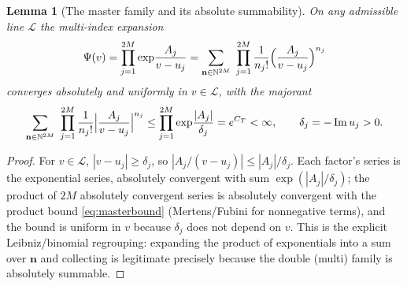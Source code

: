 \documentclass[11pt]{article}
\DeclareMathOperator{\Imag}{Im}
\newcommand{\N}{\mathbb{N}}
\theoremstyle{plain}
\newtheorem{lemma}[theorem]{Lemma}
\theoremstyle{definition}
\theoremstyle{remark}
\begin{document}
\begin{lemma}[The master family and its absolute summability]\label{lem:master}
On any admissible line $\mathcal L$ the multi-index expansion
\begin{equation}\label{eq:master}
   \Psi(v)=\prod_{j=1}^{2M}\exp\!\frac{A_j}{v-u_j}
   =\sum_{\mathbf n\in\N^{2M}}\ \prod_{j=1}^{2M}
      \frac{1}{n_j!}\Bigl(\frac{A_j}{v-u_j}\Bigr)^{n_j}
\end{equation}
converges absolutely and uniformly in $v\in\mathcal L$, with the majorant
\begin{equation}\label{eq:masterbound}
   \sum_{\mathbf n\in\N^{2M}}\ \prod_{j=1}^{2M}
     \frac{1}{n_j!}\Bigl|\frac{A_j}{v-u_j}\Bigr|^{n_j}
   \le\prod_{j=1}^{2M}\exp\!\frac{|A_j|}{\delta_j}=e^{C_T}<\infty,
   \qquad \delta_j=-\Imag u_j>0 .
\end{equation}
\end{lemma}
\begin{proof}
For $v\in\mathcal L$, $|v-u_j|\ge\delta_j$, so
$|A_j/(v-u_j)|\le|A_j|/\delta_j$. Each factor's series is the exponential series,
absolutely convergent with sum $\exp(|A_j|/\delta_j)$; the product of $2M$
absolutely convergent series is absolutely convergent with the product bound
\eqref{eq:masterbound} (Mertens/Fubini for nonnegative terms), and the bound is
uniform in $v$ because $\delta_j$ does not depend on $v$. This is the explicit
Leibniz/binomial regrouping: expanding the product of exponentials into a sum over
$\mathbf n$ and collecting is legitimate precisely because the double (multi)
family is absolutely summable.
\end{proof}
\end{document}
